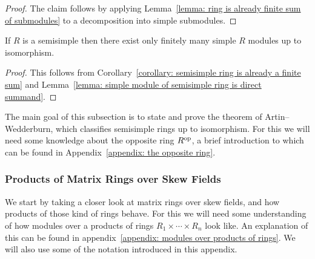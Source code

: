 \begin{proof}
 The claim follows by applying Lemma~\ref{lemma: ring is already finite sum of submodules} to a decomposition into simple submodules.
\end{proof}


\begin{corollary}
  \label{corollary: ss rings have only finitely many simple modules}
  If $R$ is a semisimple then there exist only finitely many simple $R$ modules up to isomorphism.
\end{corollary}


\begin{proof}
  This follows from Corollary~\ref{corollary: semisimple ring is already a finite sum} and Lemma~\ref{lemma: simple module of semisimple ring is direct summand}.
\end{proof}


\begin{fluff}
  The main goal of this subsection is to state and prove the theorem of Artin--Wedderburn, which classifies semisimple rings up to isomorphism.
  For this we will need some knowledge about the opposite ring $R^{\mathrm{op}}$, a brief introduction to which can be found in Appendix~\ref{appendix: the opposite ring}.
\end{fluff}





\subsubsection{Products of Matrix Rings over Skew Fields}


\begin{fluff}
  We start by taking a closer look at matrix rings over skew fields, and how products of those kind of rings behave.
  For this we will need some understanding of how modules over a products of rings $R_1 \times \dotsb \times R_n$ look like.
  An explanation of this can be found in appendix~\ref{appendix: modules over products of rings}.
  We will also use some of the notation introduced in this appendix.
\end{fluff}


